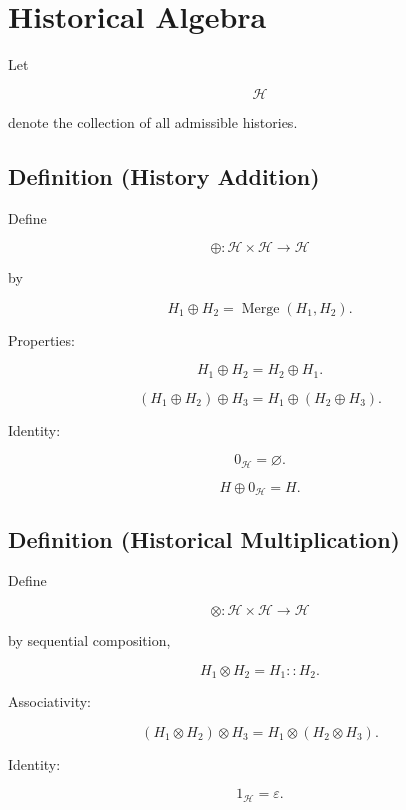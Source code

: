 \documentclass[12pt,oneside]{article}
\theoremstyle{definition}
\theoremstyle{remark}
\begin{document}
\section{Historical Algebra}

Let

\[
\mathcal H
\]

denote the collection of all admissible histories.

\subsection*{Definition (History Addition)}

Define

\[
\oplus
:
\mathcal H\times\mathcal H
\rightarrow
\mathcal H
\]

by

\[
H_1\oplus H_2
=
\operatorname{Merge}(H_1,H_2).
\]

Properties:

\[
H_1\oplus H_2
=
H_2\oplus H_1.
\]

\[
(H_1\oplus H_2)\oplus H_3
=
H_1\oplus(H_2\oplus H_3).
\]

Identity:

\[
0_{\mathcal H}
=
\varnothing.
\]

\[
H\oplus0_{\mathcal H}
=
H.
\]

\subsection*{Definition (Historical Multiplication)}

Define

\[
\otimes
:
\mathcal H\times\mathcal H
\rightarrow
\mathcal H
\]

by sequential composition,

\[
H_1\otimes H_2
=
H_1::H_2.
\]

Associativity:

\[
(H_1\otimes H_2)\otimes H_3
=
H_1\otimes(H_2\otimes H_3).
\]

Identity:

\[
1_{\mathcal H}
=
\varepsilon.
\]

\end{document}
